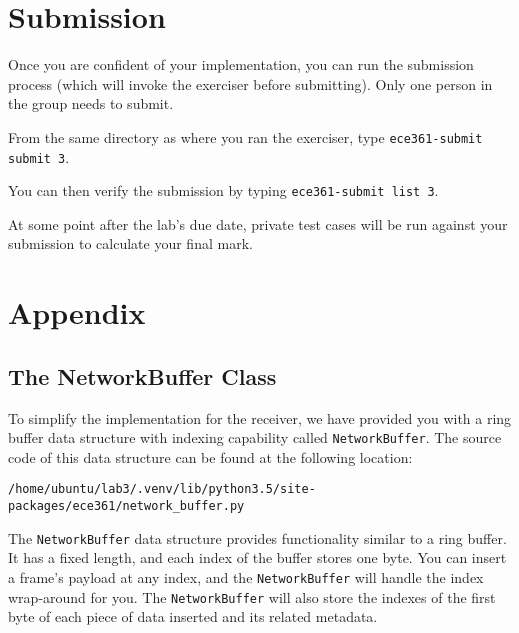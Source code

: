 \documentclass[11pt]{article}
\def\thelab{3}
\begin{document}
\section{Submission}
\label{sec:submission}
Once you are confident of your implementation, you can run the submission process (which will invoke the exerciser before submitting).
Only one person in the group needs to submit.

From the same directory as where you ran the exerciser, type \texttt{ece361-submit submit \thelab}.

You can then verify the submission by typing \texttt{ece361-submit list \thelab}.

At some point after the lab's due date, private test cases will be run against your submission to calculate your final mark.

\newpage
\appendix
\section{Appendix}
\label{sec:appendix}

\subsection{The NetworkBuffer Class}
\label{appendix_networkbuffer}
To simplify the implementation for the receiver, we have provided you with a ring buffer data structure with indexing capability called \texttt{NetworkBuffer}. The source code of this data structure can be found at the following location:

\noindent\texttt{/home/ubuntu/lab3/.venv/lib/python3.5/site-packages/ece361/network\_buffer.py}

The \texttt{NetworkBuffer} data structure provides functionality similar to a ring buffer. It has a fixed length, and each index of the buffer stores one byte. You can insert a frame's payload at any index, and the \texttt{NetworkBuffer} will handle the index wrap-around for you. The \texttt{NetworkBuffer} will also store the indexes of the first byte of each piece of data inserted and its related metadata.
\end{document}
